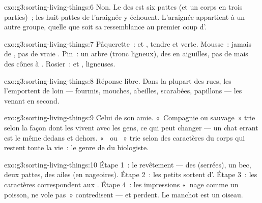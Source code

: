 \begin{solution}{exo:g3:sorting-living-things:6}
Non. Le  des  est six pattes (et un corps en trois
parties)~; les huit pattes de l'araignée y échouent. L'araignée
appartient à un autre groupe, quelle que soit sa ressemblance au
premier coup d'.
\end{solution}

\begin{solution}{exo:g3:sorting-living-things:7}
Pâquerette~:  et ,  tendre et verte. Mousse~:
jamais de , pas de vraie . Pin~: un arbre (tronc ligneux),
des  en aiguilles, pas de  mais des cônes à .
Rosier~:  et ,  ligneuses.
\end{solution}

\begin{solution}{exo:g3:sorting-living-things:8}
Réponse libre. Dans la plupart des rues, les  l'emportent de
loin --- fourmis, mouches, abeilles, scarabées, papillons --- les
 venant en second.
\end{solution}

\begin{solution}{exo:g3:sorting-living-things:9}
Celui de son amie. «~Compagnie ou sauvage~» trie selon la façon dont
les  vivent avec les gens, ce qui peut changer --- un chat
errant est le même  dedans et dehors. «~ ou
~» trie selon des caractères du corps qui restent toute la
vie~: le genre de  du biologiste.
\end{solution}

\begin{solution}{exo:g3:sorting-living-things:10}
Étape 1~: le revêtement --- des  (serrées), un bec, deux
pattes, des ailes (en nageoires). Étape 2~: les petits sortent
d'. Étape 3~: les caractères correspondent aux . Étape
4~: les impressions «~nage comme un poisson, ne vole pas~»
contredisent --- et perdent. Le manchot est un oiseau.
\end{solution}
